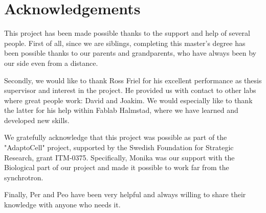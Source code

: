 


\bigskip


\begingroup

\let\clearpage\relax
\let\cleardoublepage\relax
\let\cleardoublepage\relax

\chapter*{Acknowledgements} %
\noindent This project has been made possible thanks to the support and help of several people. First of all, since we are siblings, completing this master's degree has been possible thanks to our parents and grandparents, who have always been by our side even from a distance. 

\noindent Secondly, we would like to thank Ross Friel for his excellent performance as thesis supervisor and interest in the project. He provided us with contact to other labs where great people work: David and Joakim. We would especially like to thank the latter for his help within Fablab Halmstad, where we have learned and developed new skills.

\noindent We gratefully acknowledge that this project was possible as part of the "AdaptoCell" project, supported by the Swedish Foundation for Strategic Research, grant ITM-0375. Specifically, Monika was our support with the Biological part of our project and made it possible to work far from the synchrotron.

\noindent Finally, Per and Peo have been very helpful and always willing to share their knowledge with anyone who needs it. 

\endgroup